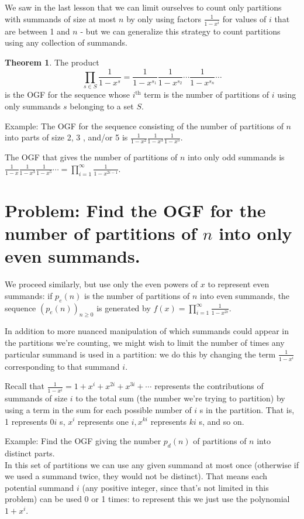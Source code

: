 \documentclass{article}
\theoremstyle{definition}
\newtheorem{theorem}{Theorem}
\begin{document}
We saw in the last lesson that we can limit ourselves to count only partitions with summands of size at most $n$ by only using factors $\frac{1}{1-x^{i}}$ for values of $i$ that are between 1 and $n$ - but we can generalize this strategy to count partitions using any collection of summands.

\begin{theorem}
The product
\[\prod_{s \in S} \frac{1}{1-x^{s}}=\frac{1}{1-x^{s_{1}}} \frac{1}{1-x^{s_{2}}} \cdots \frac{1}{1-x^{s_{n}}} \cdots\]
is the OGF for the sequence whose $i^{\text{th}}$ term is the number of partitions of $i$ using only summands $s$ belonging to a set $S$.
\end{theorem}

Example: The OGF for the sequence consisting of the number of partitions of $n$ into parts of size 2, 3 , and/or 5 is $\frac{1}{1-x^{2}} \frac{1}{1-x^{3}} \frac{1}{1-x^{5}}$.

The OGF that gives the number of partitions of $n$ into only odd summands is $\frac{1}{1-x} \frac{1}{1-x^{3}} \frac{1}{1-x^{5}} \cdots=\prod_{i=1}^{\infty} \frac{1}{1-x^{2 i-1}}$.

\section*{Problem: Find the OGF for the number of partitions of $n$ into only even summands.}
We proceed similarly, but use only the even powers of $x$ to represent even summands: if $p_{e}(n)$ is the number of partitions of $n$ into even summands, the sequence $\left(p_{e}(n)\right)_{n \geq 0}$ is generated by $f(x)=\prod_{i=1}^{\infty} \frac{1}{1-x^{2 i}}$.

In addition to more nuanced manipulation of which summands could appear in the partitions we're counting, we might wish to limit the number of times any particular summand is used in a partition: we do this by changing the term $\frac{1}{1-x^{i}}$ corresponding to that summand $i$.

Recall that $\frac{1}{1-x^{i}}=1+x^{i}+x^{2 i}+x^{3 i}+\cdots$ represents the contributions of summands of size $i$ to the total sum (the number we're trying to partition) by using a term in the sum for each possible number of $i$ s in the partition. That is, 1 represents $0 i$ s, $x^{i}$ represents one $i, x^{k i}$ represents $k i$ s, and so on.

Example: Find the OGF giving the number $p_{d}(n)$ of partitions of $n$ into distinct parts.\\
In this set of partitions we can use any given summand at most once (otherwise if we used a summand twice, they would not be distinct). That means each potential summand $i$ (any positive integer, since that's not limited in this problem) can be used 0 or 1 times: to represent this we just use the polynomial $1+x^{i}$.
\end{document}
